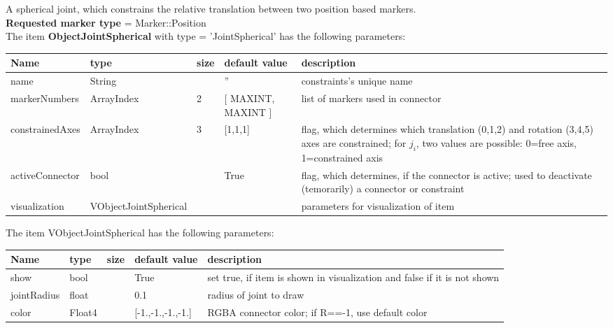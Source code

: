 A spherical joint, which constrains the relative translation between two position based markers.
 \\  {\bf Requested marker type} = Marker::Position \\ 
\vspace{12pt} \noindent The item {\bf ObjectJointSpherical} with type = 'JointSpherical' has the following parameters:\vspace{-1cm}\\ 
\begin{center}
  \footnotesize
  \begin{longtable}{| p{4.5cm} | p{2.5cm} | p{0.5cm} | p{2.5cm} | p{6cm} |}
    \hline
    \bf Name & \bf type & \bf size & \bf default value & \bf description \\ \hline
    name &     String &      &     '' &     constraints's unique name\\ \hline
    markerNumbers &     ArrayIndex &     2 &     [ MAXINT, MAXINT ] &     list of markers used in connector\\ \hline
    constrainedAxes &     ArrayIndex &     3 &     [1,1,1] &     flag, which determines which translation (0,1,2) and rotation (3,4,5) axes are constrained; for $j_i$, two values are possible: 0=free axis, 1=constrained axis\\ \hline
    activeConnector &     bool &      &     True &     flag, which determines, if the connector is active; used to deactivate (temorarily) a connector or constraint\\ \hline
    visualization & VObjectJointSpherical & & & parameters for visualization of item \\ \hline
	  \end{longtable}
	\end{center}
The item VObjectJointSpherical has the following parameters:\vspace{-1cm}\\ 
\begin{center}
  \footnotesize
  \begin{longtable}{| p{4.5cm} | p{2.5cm} | p{0.5cm} | p{2.5cm} | p{6cm} |}
    \hline
    \bf Name & \bf type & \bf size & \bf default value & \bf description \\ \hline
    show &     bool &      &     True &     set true, if item is shown in visualization and false if it is not shown\\ \hline
    jointRadius &     float &      &     0.1 &     radius of joint to draw\\ \hline
    color &     Float4 &      &     [-1.,-1.,-1.,-1.] &     RGBA connector color; if R==-1, use default color\\ \hline
	  \end{longtable}
	\end{center}

